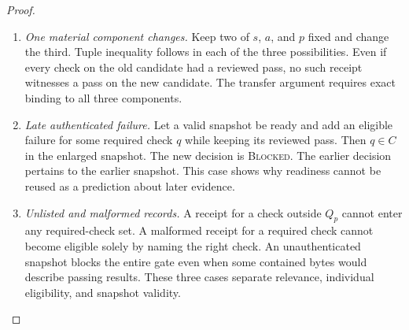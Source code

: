\begin{proof}
\begin{enumerate}
\begin{enumerate}
At the other extreme one conflicting check suffices.
\item \emph{One material component changes.}
Keep two of $s$, $a$, and $p$ fixed and change the third.
Tuple inequality follows in each of the three possibilities.
Even if every check on the old candidate had a reviewed pass,
no such receipt witnesses a pass on the new candidate.
The transfer argument requires exact binding to all
three components.
\item \emph{Late authenticated failure.}
Let a valid snapshot be ready and add an eligible failure
for some required check $q$ while keeping its reviewed pass.
Then $q\in C$ in the enlarged snapshot.
The new decision is \textsc{Blocked}.
The earlier decision pertains to the earlier snapshot.
This case shows why readiness cannot be reused as a
prediction about later evidence.
\item \emph{Unlisted and malformed records.}
A receipt for a check outside $Q_p$ cannot enter
any required-check set.
A malformed receipt for a required check cannot become
eligible solely by naming the right check.
An unauthenticated snapshot blocks the entire gate even
when some contained bytes would describe passing results.
These three cases separate relevance, individual eligibility,
and snapshot validity.
\end{enumerate}


\end{enumerate}
\end{proof}
